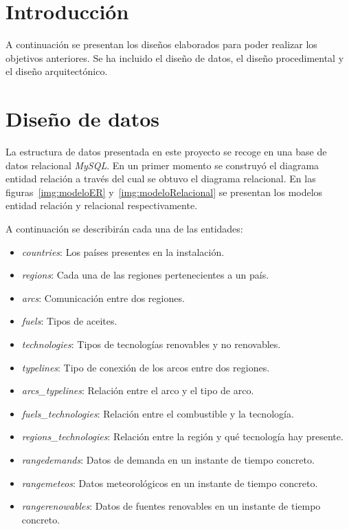 
\section{Introducción}

A continuación se presentan los diseños elaborados para poder realizar los objetivos anteriores. Se ha incluido el diseño de datos, el diseño procedimental y el diseño arquitectónico.

\section{Diseño de datos}

La estructura de datos presentada en este proyecto se recoge en una base de datos relacional \textit{MySQL}. En un primer momento se construyó el diagrama entidad relación a través del cual se obtuvo el diagrama relacional. En las figuras~\ref{img:modeloER} y~\ref{img:modeloRelacional} se presentan los modelos entidad relación y relacional respectivamente.

A continuación se describirán cada una de las entidades:

\begin{itemize}
	
	\item \textit{countries}: Los países presentes en la instalación.
	
	\item \textit{regions}: Cada una de las regiones pertenecientes a un país.
	
	\item \textit{arcs}: Comunicación entre dos regiones.
	
	\item \textit{fuels}: Tipos de aceites.
	
	\item \textit{technologies}: Tipos de tecnologías renovables y no renovables.
	
	\item \textit{typelines}: Tipo de conexión de los arcos entre dos regiones.
	
	\item \textit{arcs\_typelines}: Relación entre el arco y el tipo de arco.
	
	\item \textit{fuels\_technologies}: Relación entre el combustible y la tecnología.
	
	\item \textit{regions\_technologies}: Relación entre la región y qué tecnología hay presente.
	
	\item \textit{rangedemands}: Datos de demanda en un instante de tiempo concreto.
	
	\item \textit{rangemeteos}: Datos meteorológicos en un instante de tiempo concreto.
	
	\item \textit{rangerenowables}: Datos de fuentes renovables en un instante de tiempo concreto.

\end{itemize}

